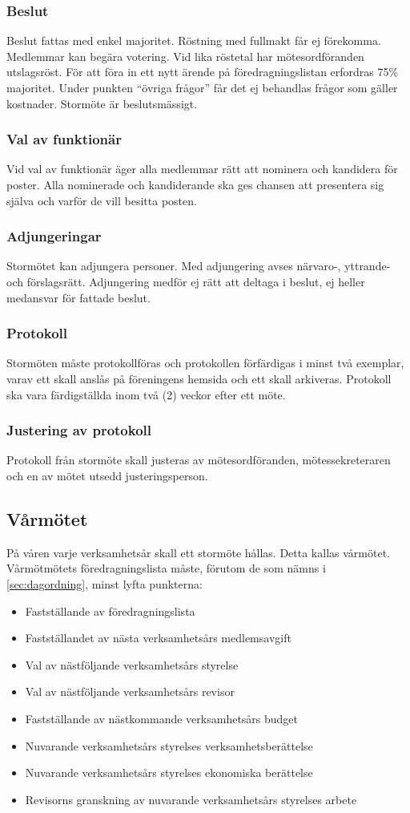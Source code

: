 \documentclass[11pt,a4paper]{article}
\begin{document}
\subsubsection{Beslut}
Beslut fattas med enkel majoritet. Röstning med fullmakt får ej förekomma. Medlemmar kan begära votering. Vid lika röstetal har mötesordföranden utslagsröst. För att föra in ett nytt ärende på föredragningslistan erfordras 75\% majoritet. Under punkten  ``övriga frågor'' får det ej behandlas frågor som gäller kostnader. Stormöte är beslutsmässigt.
\subsubsection{Val av funktionär}
Vid val av funktionär äger alla medlemmar rätt att nominera och kandidera för poster. Alla nominerade och kandiderande ska ges chansen att presentera sig själva och varför de vill besitta posten.
\subsubsection{Adjungeringar}\label{sec:adjungering}
Stormötet kan adjungera personer. Med adjungering avses närvaro-, yttrande- och förslagsrätt. Adjungering medför ej rätt att deltaga i beslut, ej heller medansvar för fattade beslut.

\subsubsection{Protokoll}
Stormöten måste protokollföras och protokollen förfärdigas i minst två exemplar, varav ett skall anslås på föreningens hemsida och ett skall arkiveras. Protokoll ska vara färdigställda inom två (2) veckor efter ett möte.
\subsubsection{Justering av protokoll}
Protokoll från stormöte skall justeras av mötesordföranden, mötessekreteraren och en av mötet utsedd justeringsperson.
\subsection{Vårmötet}
På våren varje verksamhetsår skall ett stormöte hållas. Detta kallas vårmötet. Vårmötmötets föredragningslista måste, förutom de som nämns i \ref{sec:dagordning}, minst lyfta punkterna:
\begin{itemize}
    \item Fastställande av föredragningslista
	\item Fastställandet av nästa verksamhetsårs medlemsavgift
	\item Val av nästföljande verksamhetsårs styrelse
	\item Val av nästföljande verksamhetsårs revisor
	\item Fastställande av nästkommande verksamhetsårs budget
	\item Nuvarande verksamhetsårs styrelses verksamhetsberättelse
	\item Nuvarande verksamhetsårs styrelses ekonomiska berättelse
	\item Revisorns granskning av nuvarande verksamhetsårs styrelses arbete
\end{itemize}
\end{document}
